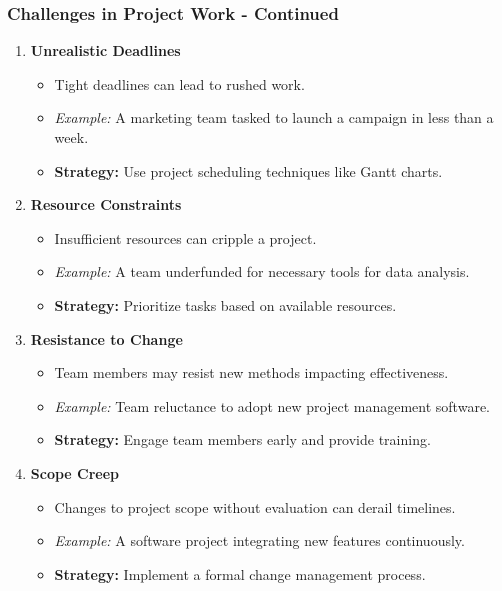 \documentclass[aspectratio=169]{beamer}
\begin{document}
\begin{frame}[fragile]
    \frametitle{Challenges in Project Work - Continued}
    \begin{enumerate}[start=3]
        \item \textbf{Unrealistic Deadlines}
        \begin{itemize}
            \item Tight deadlines can lead to rushed work.
            \item \textit{Example:} A marketing team tasked to launch a campaign in less than a week.
            \item \textbf{Strategy:} Use project scheduling techniques like Gantt charts.
        \end{itemize}

        \item \textbf{Resource Constraints}
        \begin{itemize}
            \item Insufficient resources can cripple a project.
            \item \textit{Example:} A team underfunded for necessary tools for data analysis.
            \item \textbf{Strategy:} Prioritize tasks based on available resources.
        \end{itemize}

        \item \textbf{Resistance to Change}
        \begin{itemize}
            \item Team members may resist new methods impacting effectiveness.
            \item \textit{Example:} Team reluctance to adopt new project management software.
            \item \textbf{Strategy:} Engage team members early and provide training.
        \end{itemize}

        \item \textbf{Scope Creep}
        \begin{itemize}
            \item Changes to project scope without evaluation can derail timelines.
            \item \textit{Example:} A software project integrating new features continuously.
            \item \textbf{Strategy:} Implement a formal change management process.
        \end{itemize}
    \end{enumerate}
\end{frame}
\end{document}
